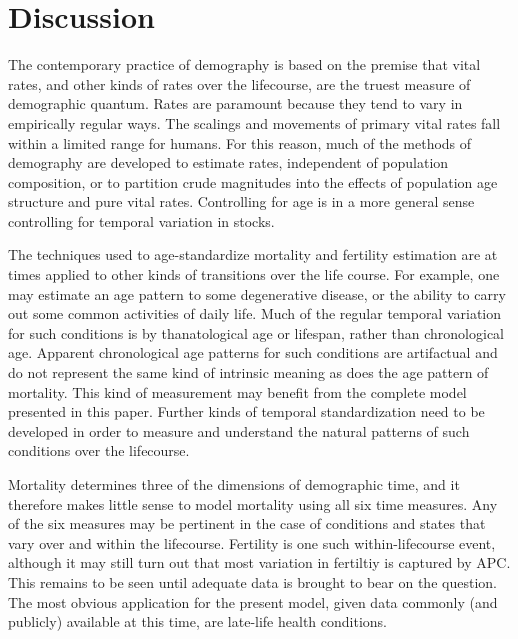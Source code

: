 \documentclass[12pt,oneside,letter]{article} %
\begin{document}
\section*{Discussion}
The contemporary practice of demography is based on the premise that vital
rates, and other kinds of rates over the lifecourse, are the truest measure of
demographic quantum. Rates are paramount because they tend to vary in
empirically regular ways. The scalings and movements of primary vital rates fall
within a limited range for humans. For this reason, much of the methods of
demography are developed to estimate rates, independent of population composition, or to
partition crude magnitudes into the effects of population age structure and
pure vital rates. Controlling for age is in a more general sense controlling for
temporal variation in stocks. 

The techniques used to age-standardize mortality and fertility estimation are at
times applied to other kinds of transitions over the life course. For example,
one may estimate an age pattern to some degenerative disease, or the
ability to carry out some common activities of daily life. Much of the
regular temporal variation for such conditions is by thanatological age or
lifespan, rather than chronological age. Apparent chronological age patterns for
such conditions are artifactual and do not represent the same kind of
intrinsic meaning as does the age pattern of mortality. This kind of
measurement may benefit from the complete model presented in this paper. Further
kinds of temporal standardization need to be developed in order to measure and
understand the natural patterns of such conditions over the lifecourse.

Mortality determines three of the dimensions of
demographic time, and it therefore makes little sense to model mortality using
all six time measures. Any of the six measures may be pertinent in the case of
conditions and states that vary over and within the lifecourse. Fertility is one
such within-lifecourse event, although it may still turn out that most
variation in fertiltiy is captured by APC. This remains to be seen until
adequate data is brought to bear on the question. The most obvious application
for the present model, given data commonly (and publicly) available at this
time, are late-life health conditions. 



\FloatBarrier
\end{document}
